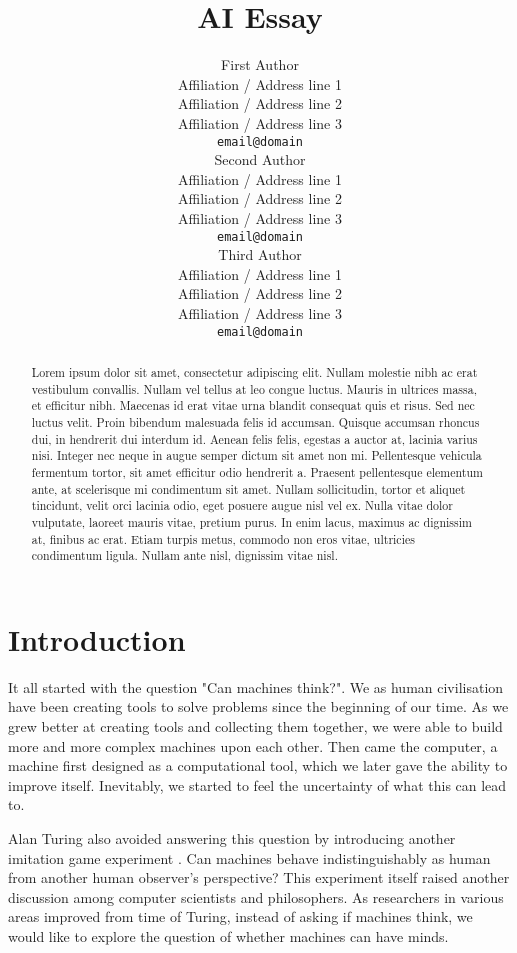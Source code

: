 \documentclass[11pt]{article}
\title{AI Essay}
\author{First Author \\
  Affiliation / Address line 1 \\
  Affiliation / Address line 2 \\
  Affiliation / Address line 3 \\
  {\tt email@domain} \\\And
  Second Author \\
  Affiliation / Address line 1 \\
  Affiliation / Address line 2 \\
  Affiliation / Address line 3 \\
  {\tt email@domain} \\\And
  Third Author \\
  Affiliation / Address line 1 \\
  Affiliation / Address line 2 \\
  Affiliation / Address line 3 \\
  {\tt email@domain} \\}
\date{}
\newcommand{\sk}[1]{{\color{dark-green-2} #1}}
\begin{document}
\maketitle
\begin{abstract}
\sk{
Lorem ipsum dolor sit amet, consectetur adipiscing elit. Nullam molestie nibh ac erat vestibulum convallis. Nullam vel tellus at leo congue luctus. Mauris in ultrices massa, et efficitur nibh. Maecenas id erat vitae urna blandit consequat quis et risus. Sed nec luctus velit. Proin bibendum malesuada felis id accumsan. Quisque accumsan rhoncus dui, in hendrerit dui interdum id. Aenean felis felis, egestas a auctor at, lacinia varius nisi. Integer nec neque in augue semper dictum sit amet non mi. Pellentesque vehicula fermentum tortor, sit amet efficitur odio hendrerit a. Praesent pellentesque elementum ante, at scelerisque mi condimentum sit amet. Nullam sollicitudin, tortor et aliquet tincidunt, velit orci lacinia odio, eget posuere augue nisl vel ex. Nulla vitae dolor vulputate, laoreet mauris vitae, pretium purus. In enim lacus, maximus ac dignissim at, finibus ac erat. Etiam turpis metus, commodo non eros vitae, ultricies condimentum ligula. Nullam ante nisl, dignissim vitae nisl. 
}
\end{abstract}

\section{Introduction}
\label{sec:introduction}

It all started with the question "Can machines think?". We as human civilisation have been creating tools to solve problems since the beginning of our time. As we grew better at creating tools and collecting them together, we were able to build more and more complex machines upon each other. Then came the computer, a machine first designed as a computational tool, which we later gave the ability to improve itself. Inevitably, we started to feel the uncertainty of what this can lead to.

Alan Turing also  avoided answering this question by introducing another imitation game experiment \cite{turing1950computing}. Can machines behave indistinguishably as human from another human observer's perspective? This experiment itself raised another discussion among computer scientists and philosophers. As researchers in various areas improved from time of Turing, instead of asking if machines think, we would like to explore the question of whether machines can have minds.
\end{document}
